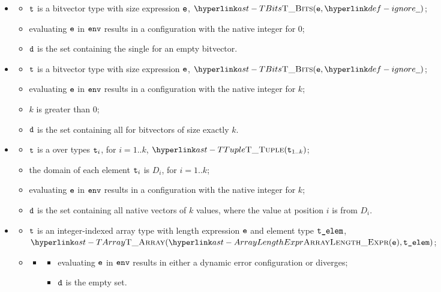 \begin{itemize}
  \item {}
  \begin{itemize}
    \item $\texttt{t}$ is a bitvector type with size expression $\texttt{e}$, $\TBits(\ve, \Ignore)$;
    \item evaluating $\texttt{e}$ in $\texttt{env}$ results in a configuration with the native integer for $0$;
    \item $\texttt{d}$ is the set containing the single \nativevalueterm{} for an empty bitvector.
  \end{itemize}

  \item {}
  \begin{itemize}
    \item $\texttt{t}$ is a bitvector type with size expression $\texttt{e}$, $\TBits(\ve, \Ignore)$;
    \item evaluating $\texttt{e}$ in $\texttt{env}$ results in a configuration with the native integer for $k$;
    \item $k$ is greater than $0$;
    \item $\texttt{d}$ is the set containing all \nativevaluesterm{} for bitvectors of size exactly $k$.
  \end{itemize}

  \item {}
  \begin{itemize}
    \item $\texttt{t}$ is a \tupletypeterm{} over types $\texttt{t}_i$, for $i=1..k$, $\TTuple(\vt_{1..k})$;
    \item the domain of each element $\texttt{t}_i$ is $D_i$, for $i=1..k$;
    \item evaluating $\texttt{e}$ in $\texttt{env}$ results in a configuration with the native integer for $k$;
    \item $\texttt{d}$ is the set containing all native vectors of $k$ values, where the value at position $i$
    is from $D_i$.
  \end{itemize}

  \item \AllApply
  \begin{itemize}
    \item $\texttt{t}$ is an integer-indexed array type with length expression $\texttt{e}$ and element type $\texttt{t\_elem}$, $\TArray(\ArrayLengthExpr(\ve), \telem)$;
    \item \OneApplies
      \begin{itemize}
      \item {}
      \begin{itemize}
        \item evaluating $\texttt{e}$ in $\texttt{env}$ results in either a dynamic error configuration or diverges;
        \item $\texttt{d}$ is the empty set.
      \end{itemize}


\end{itemize}
\end{itemize}
\end{itemize}
